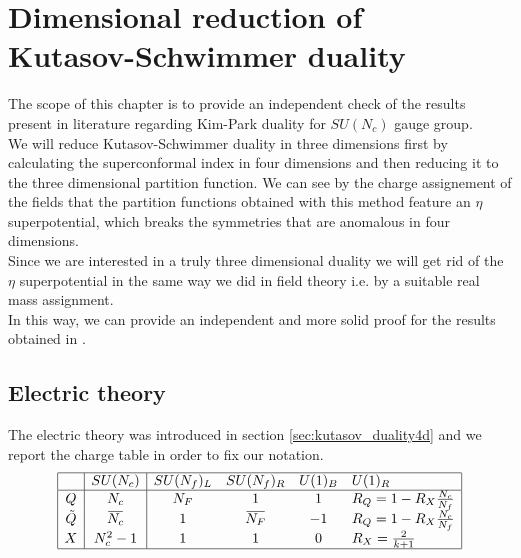 

\chapter{Dimensional reduction of \\ Kutasov-Schwimmer duality}

The scope of this chapter is to provide an independent check of the results present in literature regarding Kim-Park duality for $SU(N_c)$ gauge group.\\
We will reduce Kutasov-Schwimmer duality in three dimensions first by calculating the superconformal index in four dimensions and then reducing it to the three dimensional partition function.
We can see by the charge assignement of the fields that the partition functions obtained with this method feature an $\eta$ superpotential, which breaks the symmetries that are anomalous in four dimensions.\\
Since we are interested in a truly three dimensional duality we will get rid of the $\eta$ superpotential in the same way we did in field theory i.e. by a suitable real mass assignment.\\
In this way, we can provide an independent and more solid proof for the results obtained in \cite{Nii:2014jsa}.


\section{Electric theory}
The electric theory was introduced in section \ref{sec:kutasov_duality4d} and we report the charge table in order to fix our notation.
\begin{equation}
\begin{array}{| c | c | c c c l | }
\hline
 & SU(N_c) &SU(N_f)_L  &SU(N_f)_R   & U(1)_B &  U(1)_R \\
\hline
Q & N_c&N_F & 1   &  1  & R_Q =  1 - 
R_X %
 \frac{N_c}{N_f}  \\
\tilde{Q} & \overbar{N_c} &  1 & \overbar{ N_F}   & -1   &   R_Q = 1 -
 R_X %
  \frac{N_c}{N_f}    \\
X & N_c^2-1 & 1   & 1    & 0   &  R_X = \frac{2}{k+1} \\
\hline
\end{array}
\centering
\end{equation}
